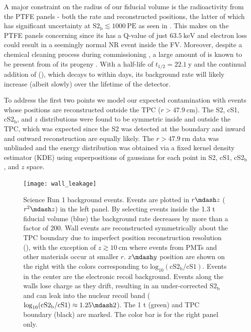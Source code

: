 A major constraint on the radius of our fiducial volume is the radioactivity from the PTFE panels - both the rate and reconstructed
positions, the latter of which has significant uncertainty at $\mathrm{S2_b} \lesssim 1000\ \mathrm{PE}$ as seen in
.  This makes  on the PTFE panels concerning since its \betadecay has
a Q-value of just $63.5\ \mathrm{keV}$ and electron loss could result in a seemingly normal NR event inside the FV.  Moreover, despite a
chemical cleaning process during commissioning , a large amount of  is known to be present from
\alphadecays of its progeny
.  With a half-life of $t_{1/2} = 22.1\ \mathrm{y}$ and the continual addition of 
(), which decays to  within days, its background rate will likely increase
(albeit slowly) over the lifetime of the detector.

To address the first two points we model our expected contamination with events whose positions are reconstructed outside the
TPC ($r > 47.9\ \mathrm{cm}$).  The S2, cS1, cS2$_{\mathrm{b}}$, and $z$
distributions were found to be symmetric inside and outside the TPC, which was expected since the S2 was detected at the boundary and
inward and outward reconstruction are equally likely.  The
$r > 47.9\ \mathrm{rm}$ data was unblinded and the energy distribution was obtained via a fixed kernel density estimator (KDE) using
superpositions of gaussians for each point in S2, cS1, cS2$_{\mathrm{b}}$, and $z$ space.

\begin{figure}
\centering
\texttt{[image: wall\_leakage]}
\caption[Science Run 1 background events in $r \mdash z$ ($r^2 \mdash z$) and $x \mdash y$.]{Science Run 1 background events.  Events
are plotted in $r \mdash z$ ($r^2 \mdash z$) in the left panel.  By selecting events inside the 1.3
t fiducial volume (blue) the background rate decreases by more than a factor of 200.  Wall events are reconstructed symmetrically
about the TPC boundary due to imperfect position reconstruction resolution (), with the
exception of $z \gtrsim 10\ \mathrm{cm}$ where events from PMTs and other materials occur at smaller $r$.  $x \mdash y$ position are shown
on the right with the colors corresponding to $\mathrm{log}_{10}(\mathrm{cS2_b / cS1})$.  Events in the center are the electronic recoil
background.  Events along the walls lose charge as they drift,
resulting in an under-corrected $\mathrm{S2_b}$ and can leak into the nuclear recoil band
($\mathrm{log}_{10}(\mathrm{cS2_b / cS1}) \approx 1.25 \mdash 2$).  The 1 t (green) and TPC boundary (black) are marked.  The color bar is
for the right panel only.}
\label{fig:backgrounds_detector_materials_wall_leakage}
\end{figure}

